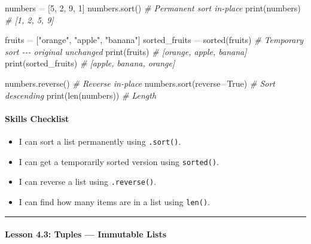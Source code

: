 \documentclass[
  justified,
  openright,
]{tufte-book}
\let\subsection\paragraph
\let\paragraph\paragraph
\newcommand{\StringTok}[1]{\textcolor{CodeString}{#1}}              %
\newcommand{\CommentTok}[1]{\textcolor{CodeComment}{\textit{#1}}}  %
\newcommand{\CodeNumTok}[1]{\textcolor{CodeNumber}{#1}}             %
\newcommand{\OperatorTok}[1]{\textcolor{DarkGray}{#1}}              %
\newenvironment{Shaded}{%
  \begin{mdframed}[style=TufteCode]%
}{%
  \end{mdframed}%
}
\let\subsection\paragraph
\let\paragraph\paragraph
\providecommand{\tightlist}{%
  \setlength{\itemsep}{0pt}\setlength{\parskip}{0pt}}
\begin{document}
\begin{Shaded}
\begin{Highlighting}[]
numbers \OperatorTok{=} [\CodeNumTok{5}, \CodeNumTok{2}, \CodeNumTok{9}, \CodeNumTok{1}]
numbers.sort()                          \CommentTok{\# Permanent sort in{-}place}
print(numbers)                          \CommentTok{\# [1, 2, 5, 9]}
 
fruits \OperatorTok{=} [\StringTok{"orange"}, \StringTok{"apple"}, \StringTok{"banana"}]
sorted\_fruits \OperatorTok{=} sorted(fruits)          \CommentTok{\# Temporary sort {-}{-}{-} original unchanged}
print(fruits)                           \CommentTok{\# [\textquotesingle{}orange\textquotesingle{}, \textquotesingle{}apple\textquotesingle{}, \textquotesingle{}banana\textquotesingle{}]}
print(sorted\_fruits)                    \CommentTok{\# [\textquotesingle{}apple\textquotesingle{}, \textquotesingle{}banana\textquotesingle{}, \textquotesingle{}orange\textquotesingle{}]}
 
numbers.reverse()                       \CommentTok{\# Reverse in{-}place}
numbers.sort(reverse\OperatorTok{=}True)              \CommentTok{\# Sort descending}
print(len(numbers))                     \CommentTok{\# Length}
\end{Highlighting}
\end{Shaded}

\subsection{Skills Checklist}\label{skills-checklist-18}

\begin{itemize}
\tightlist
\item[$\square$]
  I can sort a list permanently using \texttt{.sort()}.
\item[$\square$]
  I can get a temporarily sorted version using \texttt{sorted()}.
\item[$\square$]
  I can reverse a list using \texttt{.reverse()}.
\item[$\square$]
  I can find how many items are in a list using \texttt{len()}.
\end{itemize}

\begin{center}\rule{0.5\linewidth}{0.5pt}\end{center}

\subsection{Lesson 4.3: Tuples --- Immutable
Lists}\label{lesson-4.3-tuples-immutable-lists}
\end{document}
